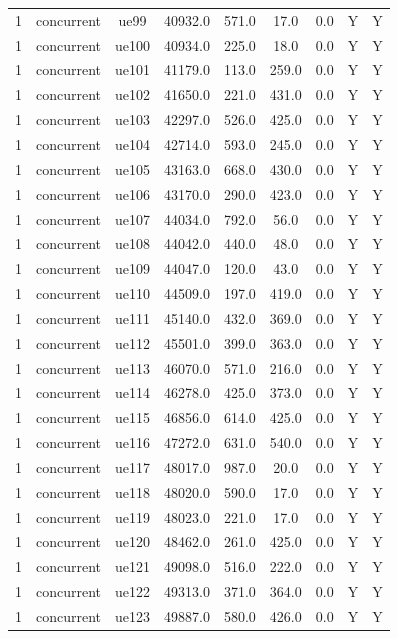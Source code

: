 \begin{table}[ht]
\begin{tabular}{|c|c|c|c|c|c|c|c|c|}
1 & concurrent & ue99 & 40932.0 & 571.0 & 17.0 & 0.0 & Y & Y \\
1 & concurrent & ue100 & 40934.0 & 225.0 & 18.0 & 0.0 & Y & Y \\
1 & concurrent & ue101 & 41179.0 & 113.0 & 259.0 & 0.0 & Y & Y \\
1 & concurrent & ue102 & 41650.0 & 221.0 & 431.0 & 0.0 & Y & Y \\
1 & concurrent & ue103 & 42297.0 & 526.0 & 425.0 & 0.0 & Y & Y \\
1 & concurrent & ue104 & 42714.0 & 593.0 & 245.0 & 0.0 & Y & Y \\
1 & concurrent & ue105 & 43163.0 & 668.0 & 430.0 & 0.0 & Y & Y \\
1 & concurrent & ue106 & 43170.0 & 290.0 & 423.0 & 0.0 & Y & Y \\
1 & concurrent & ue107 & 44034.0 & 792.0 & 56.0 & 0.0 & Y & Y \\
1 & concurrent & ue108 & 44042.0 & 440.0 & 48.0 & 0.0 & Y & Y \\
1 & concurrent & ue109 & 44047.0 & 120.0 & 43.0 & 0.0 & Y & Y \\
1 & concurrent & ue110 & 44509.0 & 197.0 & 419.0 & 0.0 & Y & Y \\
1 & concurrent & ue111 & 45140.0 & 432.0 & 369.0 & 0.0 & Y & Y \\
1 & concurrent & ue112 & 45501.0 & 399.0 & 363.0 & 0.0 & Y & Y \\
1 & concurrent & ue113 & 46070.0 & 571.0 & 216.0 & 0.0 & Y & Y \\
1 & concurrent & ue114 & 46278.0 & 425.0 & 373.0 & 0.0 & Y & Y \\
1 & concurrent & ue115 & 46856.0 & 614.0 & 425.0 & 0.0 & Y & Y \\
1 & concurrent & ue116 & 47272.0 & 631.0 & 540.0 & 0.0 & Y & Y \\
1 & concurrent & ue117 & 48017.0 & 987.0 & 20.0 & 0.0 & Y & Y \\
1 & concurrent & ue118 & 48020.0 & 590.0 & 17.0 & 0.0 & Y & Y \\
1 & concurrent & ue119 & 48023.0 & 221.0 & 17.0 & 0.0 & Y & Y \\
1 & concurrent & ue120 & 48462.0 & 261.0 & 425.0 & 0.0 & Y & Y \\
1 & concurrent & ue121 & 49098.0 & 516.0 & 222.0 & 0.0 & Y & Y \\
1 & concurrent & ue122 & 49313.0 & 371.0 & 364.0 & 0.0 & Y & Y \\
1 & concurrent & ue123 & 49887.0 & 580.0 & 426.0 & 0.0 & Y & Y \\

\end{tabular}
\end{table}
